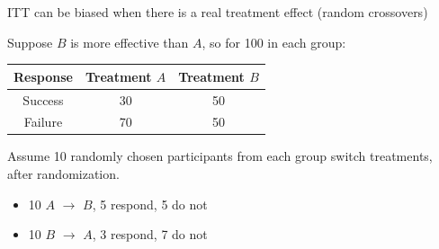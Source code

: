 \documentclass[ignorenonframetext,]{beamer}
\begin{document}
\begin{frame}{ITT can be biased when there is a real treatment effect
(random crossovers)}

Suppose \(B\) is more effective than \(A\), so for 100 in each group:

\begin{longtable}[c]{@{}ccc@{}}
\toprule
\begin{minipage}[b]{0.15\columnwidth}\centering\strut
Response
\strut\end{minipage} &
\begin{minipage}[b]{0.22\columnwidth}\centering\strut
Treatment \(A\)
\strut\end{minipage} &
\begin{minipage}[b]{0.25\columnwidth}\centering\strut
Treatment \(B\)
\strut\end{minipage}\tabularnewline
\midrule
\endhead
\begin{minipage}[t]{0.15\columnwidth}\centering\strut
Success
\strut\end{minipage} &
\begin{minipage}[t]{0.22\columnwidth}\centering\strut
30
\strut\end{minipage} &
\begin{minipage}[t]{0.25\columnwidth}\centering\strut
50
\strut\end{minipage}\tabularnewline
\begin{minipage}[t]{0.15\columnwidth}\centering\strut
Failure
\strut\end{minipage} &
\begin{minipage}[t]{0.22\columnwidth}\centering\strut
70
\strut\end{minipage} &
\begin{minipage}[t]{0.25\columnwidth}\centering\strut
50
\strut\end{minipage}\tabularnewline
\bottomrule
\end{longtable}

Assume 10 randomly chosen participants from each group switch
treatments, after randomization.

\begin{itemize}
\item
  10 \(A\) \(\rightarrow\) \(B\), 5 respond, 5 do not
\item
  10 \(B\) \(\rightarrow\) \(A\), 3 respond, 7 do not
\end{itemize}

\end{frame}
\end{document}
